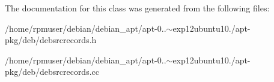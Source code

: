 \-The documentation for this class was generated from the following files\-:\begin{DoxyCompactItemize}
\item 
/home/rpmuser/debian/debian\-\_\-apt/apt-\/0..$\sim$exp12ubuntu10./apt-\/pkg/deb/debsrcrecords.\-h\item 
/home/rpmuser/debian/debian\-\_\-apt/apt-\/0..$\sim$exp12ubuntu10./apt-\/pkg/deb/debsrcrecords.\-cc\end{DoxyCompactItemize}
